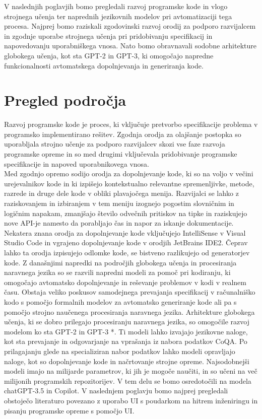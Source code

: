 \documentclass[12pt,a4paper]{book}
\begin{document}
V naslednjih poglavjih bomo pregledali razvoj programske kode in vlogo strojnega učenja ter naprednih jezikovnih modelov pri avtomatizaciji tega procesa. Najprej bomo raziskali zgodovinski razvoj orodij za podporo razvijalcem in zgodnje uporabe strojnega učenja pri pridobivanju specifikacij in napovedovanju uporabniškega vnosa. Nato bomo obravnavali sodobne arhitekture globokega učenja, kot sta GPT-2 in GPT-3, ki omogočajo napredne funkcionalnosti avtomatskega dopolnjevanja in generiranja kode.



\chapter{Pregled področja}
Razvoj programske kode je proces, ki vključuje pretvorbo specifikacije problema v programsko implementirano rešitev. Zgodnja orodja za olajšanje postopka so uporabljala strojno učenje za podporo razvijalcev skozi vse faze razvoja programske opreme in so med drugimi vključevala pridobivanje programske specifikacije in napoved uporabnikovega vnosa. \textcite{zhang2003machine} \\
Med zgodnjo opremo sodijo orodja za dopolnjevanje kode, ki so na voljo v večini urejevalnikov kode in ki izpišejo kontekstualno relevantne spremenljivke, metode, razrede in druge dele kode v obliki plavajočega menija. Razvijalci se lahko z raziskovanjem in izbiranjem v tem meniju izognejo pogostim slovničnim in logičnim napakam, zmanjšajo število odvečnih pritiskov na tipke in raziskujejo nove API-je namesto da porabljajo čas in napor za iskanje dokumentacije. Nekatera znana orodja za dopolnjevanje kode vključujejo IntelliSense v Visual Studio Code in vgrajeno dopolnjevanje kode v orodjih JetBrains IDE2. 
Čeprav lahko ta orodja izpisujejo odlomke kode, se bistveno razlikujejo od generatorjev kode.
Z današnjimi napredki na področjih globokega učenja in procesiranja naravnega jezika so se razvili napredni modeli za pomoč pri kodiranju, ki omogočajo avtomatsko dopolnjevanje in reševanje problemov v kodi v realnem času.
Obstaja veliko poskusov samodejnega prevajanja specifikacij v računalniško kodo s pomočjo formalnih modelov za avtomatsko generiranje kode ali pa s pomočjo strojno naučenega procesiranja naravnega jezika. Arhitekture globokega učenja, ki se dobro prilegajo procesiranju naravnega jezika, so omogočile razvoj modelom ko sta GPT-2 in GPT-3 *. Ti modeli lahko izvajajo jezikovne naloge, kot sta prevajanje in odgovarjanje na vprašanja iz nabora podatkov CoQA. Po prilagajanju glede na specializiran nabor podatkov lahko modeli opravljajo naloge, kot so dopolnjevanje kode in načrtovanje strojne opreme.  Najsodobnejši modeli imajo na milijarde parametrov, ki jih je mogoče naučiti, in so učeni na več milijonih programskih repozitorijev. V tem delu se bomo osredotočili na modela chatGPT-3.5 in Copilot.
V naslednjem poglavju bomo najprej pregledali obstoječo literaturo povezano z uporabo UI s poudarkom na hitrem inženiringu in pisanju programske opreme s pomočjo UI. 
\end{document}
